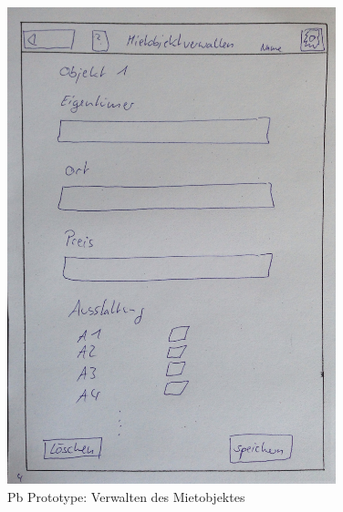 \begin{figure}[H]
\centering
\includegraphics[angle=90, width=0.85\textwidth]{./images/paperbased/objektveralten.JPG}
\caption{Pb Prototype: Verwalten des Mietobjektes}
\label{pbprototype10}
\end{figure}

